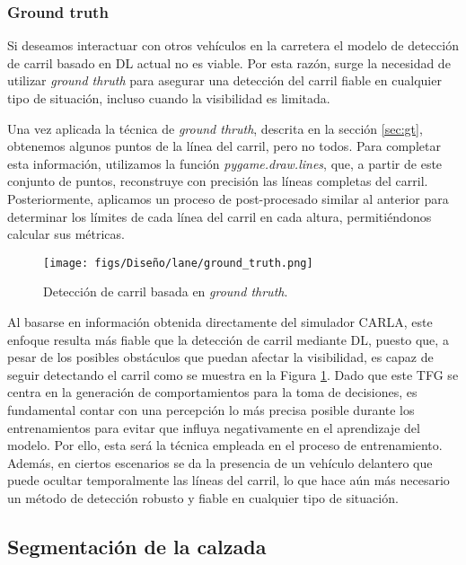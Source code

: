 \subsubsection{Ground truth}

Si deseamos interactuar con otros vehículos en la carretera el modelo de detección de carril basado en \ac{DL} actual no es viable. Por esta razón, surge la necesidad de utilizar \textit{ground thruth} para asegurar una detección del carril fiable en cualquier tipo de situación, incluso cuando la visibilidad es limitada.

Una vez aplicada la técnica de \textit{ground thruth}, descrita en la sección \ref{sec:gt}, obtenemos algunos puntos de la línea del carril, pero no todos. Para completar esta información, utilizamos la función \textit{pygame.draw.lines}, que, a partir de este conjunto de puntos, reconstruye con precisión las líneas completas del carril. Posteriormente, aplicamos un proceso de post-procesado similar al anterior para determinar los límites de cada línea del carril en cada altura, permitiéndonos calcular sus métricas.

\begin{figure}[ht]
\centering
\texttt{[image: figs/Diseño/lane/ground\_truth.png]}
\caption{Detección de carril basada en \textit{ground thruth}.}
\label{fig:gt_final_carril}
\end{figure}

\newpage

Al basarse en información obtenida directamente del simulador CARLA, este enfoque resulta más fiable que la detección de carril mediante \ac{DL}, puesto que, a pesar de los posibles obstáculos que puedan afectar la visibilidad, es capaz de seguir detectando el carril como se muestra en la Figura \ref{fig:gt_final_carril}. Dado que este \ac{TFG} se centra en la generación de comportamientos para la toma de decisiones, es fundamental contar con una percepción lo más precisa posible durante los entrenamientos para evitar que influya negativamente en el aprendizaje del modelo. Por ello, esta será la técnica empleada en el proceso de entrenamiento. Además, en ciertos escenarios se da la presencia de un vehículo delantero que puede ocultar temporalmente las líneas del carril, lo que hace aún más necesario un método de detección robusto y fiable en cualquier tipo de situación.

\subsection{Segmentación de la calzada}
\label{sec:per_ef}

